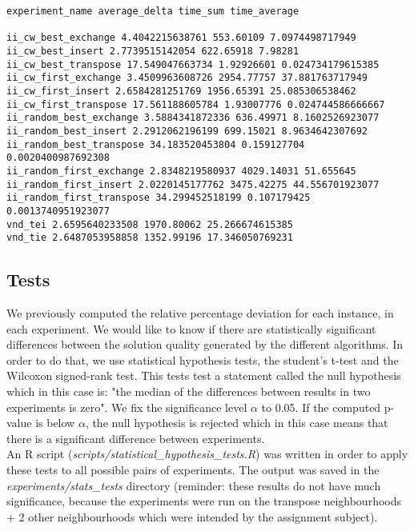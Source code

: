 \begin{lstlisting}
experiment_name average_delta time_sum time_average

ii_cw_best_exchange 4.4042215638761 553.60109 7.0974498717949
ii_cw_best_insert 2.7739515142054 622.65918 7.98281
ii_cw_best_transpose 17.549047663734 1.92926601 0.024734179615385
ii_cw_first_exchange 3.4509963608726 2954.77757 37.881763717949
ii_cw_first_insert 2.6584281251769 1956.65391 25.085306538462
ii_cw_first_transpose 17.561188605784 1.93007776 0.024744586666667
ii_random_best_exchange 3.5884341872336 636.49971 8.1602526923077
ii_random_best_insert 2.2912062196199 699.15021 8.9634642307692
ii_random_best_transpose 34.183520453804 0.159127704 0.0020400987692308
ii_random_first_exchange 2.8348219580937 4029.14031 51.655645
ii_random_first_insert 2.0220145177762 3475.42275 44.556701923077
ii_random_first_transpose 34.299452518199 0.107179425 0.0013740951923077
vnd_tei 2.6595640233508 1970.80062 25.266674615385
vnd_tie 2.6487053958858 1352.99196 17.346050769231
\end{lstlisting}

\newpage

\subsection{Tests}
We previously computed the relative percentage deviation for each instance, in
each experiment. We would like to know if there are statistically significant
differences between the solution quality generated by the different algorithms.
In order to do that, we use statistical hypothesis tests, the student's t-test
and the Wilcoxon signed-rank test. This tests test a statement called the
null hypothesis which in this case is: "the median of the differences between
results in two experiments is zero". We fix the significance level $\alpha$ to
0.05. If the computed p-value is below $\alpha$, the null hypothesis is rejected
which in this case means that there is a significant difference between
experiments.\\

An R script (\emph{scripts/statistical\_hypothesis\_tests.R}) was written in order
to apply these tests to all possible pairs of experiments. The output was saved
in the \emph{experiments/stats\_tests} directory (reminder: these
results do not have much significance, because the experiments were run on
the transpose neighbourhoods + 2 other neighbourhoods which were intended by the
assignment subject).\\

